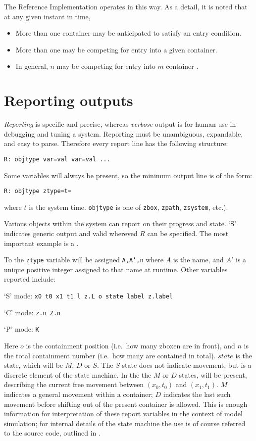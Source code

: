 The Reference Implementation operates in this way.
As a detail, it is noted that at any given instant in time,
\begin{itemize}
\item More than one container may be anticipated to satisfy an entry condition.
\item More than one  may be competing for entry into a given container.
\item In general, $n$  may be competing for entry into $m$ container .
\end{itemize}

\section{Reporting outputs}
\label{secrep}

\emph{Reporting} is specific and precise, whereas \emph{verbose} output
is for human use in debugging and tuning a system.
Reporting must be unambiguous, expandable, and easy to parse.
Therefore every report line has the following structure:

{\tt R: objtype var=val var=val ...}

Some variables will always be present, so the minimum output line is of the form:

{\tt R: objtype ztype=\dotss t=\dotss }

where $t$ is the system time. {\tt objtype} is one of {\tt zbox}, {\tt zpath}, {\tt zsystem}, etc.).

Various objects within the system can report on their progress and state.
`S' indicates generic output and valid whereved $R$ can be specified.
The most important example is a .

To the {\tt ztype} variable will be assigned {\tt A,A',n} where $A$ is
the  name, and $A'$ is a unique positive integer assigned
to that name at runtime. Other variables reported include:

`S' mode: {\tt x0 t0 x1 t1 l z.L o state label z.label}

`C' mode: {\tt z.n Z.n }

`P' mode: {\tt K}

Here $o$ is the containment position (i.e.~how many zboxen are in
front), and $n$ is the total containment number (i.e.~how many are
contained in total).  $state$ is the  state, which will be $M$,
$D$ or $S$. The $S$ state does not indicate movement, but is a discrete
element of the state machine. In the the $M$ or $D$ states,   will be
present, describing the current free movement between $(x_0,t_0)$ and $(x_1,t_1)$.
$M$ indicates a general movement within a container; $D$ indicates the last such movement
before shifting out of the present container is allowed. This is enough information
for interpretation of these report variables in the context of model simulation;
for internal details of the  state machine the use is of course referred
to the source code, outlined in .

